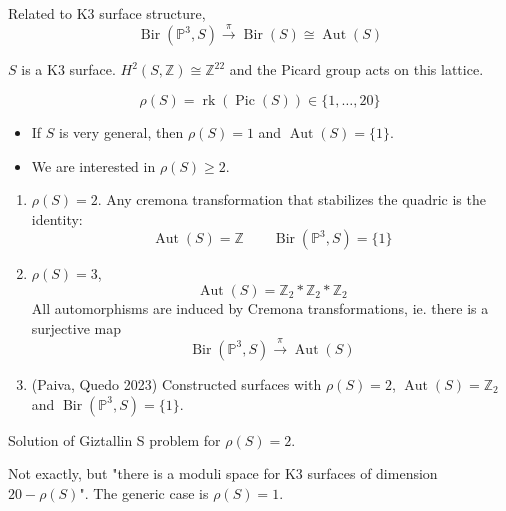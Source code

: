 \begin{enumerate}
\begin{remark}
	Related to K3 surface structure,
	\[\operatorname{Bir}(\mathbb{P}^3,S)\overset{\pi}{\longrightarrow}\operatorname{Bir}(S)\cong \operatorname{Aut}(S)\]
\end{remark}

$S$ is a K3 surface. $H^{2}(S,\mathbb{Z})\cong \mathbb{Z}^{22}$ and the Picard group acts on this lattice.

\begin{defn}
	\[\rho(S)=\operatorname{rk}(\operatorname{Pic}(S))\in\{1,\ldots,20\}\]
\end{defn}

\begin{itemize}
\item If $S$ is very general, then $\rho(S)=1$ and $\operatorname{Aut}(S)=\{1\}$.

\item We are interested in $\rho(S)\geq 2$.
\end{itemize}
\end{enumerate}

\begin{example}[Oguiso, 2012]\leavevmode 
	\begin{enumerate}
		\item $\rho(S)=2$. Any cremona transformation that stabilizes the quadric is the identity:
			\[\operatorname{Aut}(S)=\mathbb{Z}\qquad \operatorname{Bir}(\mathbb{P}^3,S)=\{1\}\]
	
			
		\item $\rho(S)=3$,
			\[\operatorname{Aut}(S)=\mathbb{Z}_2*\mathbb{Z}_2*\mathbb{Z}_2\]
			All automorphisms are induced by Cremona transformations, ie. there is a surjective map
			\[\operatorname{Bir}(\mathbb{P}^3,S)\overset{\pi}{\longrightarrow}\operatorname{Aut}(S)\]

		\item (Paiva, Quedo 2023) Constructed surfaces with $\rho(S)=2$, $\operatorname{Aut}(S)=\mathbb{Z}_2$ and $\operatorname{Bir}(\mathbb{P}^3,S)=\{1\}$.
	\end{enumerate}
\end{example}

\begin{thm}\leavevmode
	Solution of Giztallin S problem for $\rho(S)=2$.
\end{thm}

\begin{remark}
	Not exactly, but "there is a moduli space for K3 surfaces of dimension $20-\rho(S)$". The generic case is $\rho(S)=1$.
\end{remark}

